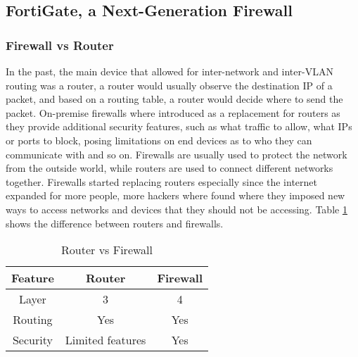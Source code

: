 \documentclass[12pt]{report}
\begin{document}
\subsection{FortiGate, a Next-Generation Firewall}
\subsubsection{Firewall vs Router}
In the past, the main device that allowed for inter-network and inter-VLAN routing was a router, a router would usually observe the destination IP of a packet, and based on a routing table, a router would decide where to send the packet. On-premise firewalls where introduced as a replacement for routers as they provide additional security features, such as what traffic to allow, what IPs or ports to block, posing limitations on end devices as to who they can communicate with and so on. Firewalls are usually used to protect the network from the outside world, while routers are used to connect different networks together. Firewalls started replacing routers especially since the internet expanded for more people, more hackers where found where they imposed new ways to access networks and devices that they should not be accessing. Table \ref{tab:router vs firewall} shows the difference between routers and firewalls. %
\begin{table}[h]
    \centering
    \begin{tabular}{|c|c|c|}
    \hline
    \textbf{Feature} & \textbf{Router} & \textbf{Firewall} \\ \hline
    Layer & 3 & 4 \\ \hline
    Routing & Yes & Yes \\ \hline
    Security & Limited features & Yes \\ \hline
    \end{tabular}
    \caption{Router vs Firewall}
    \label{tab:router vs firewall}
\end{table}
\end{document}
